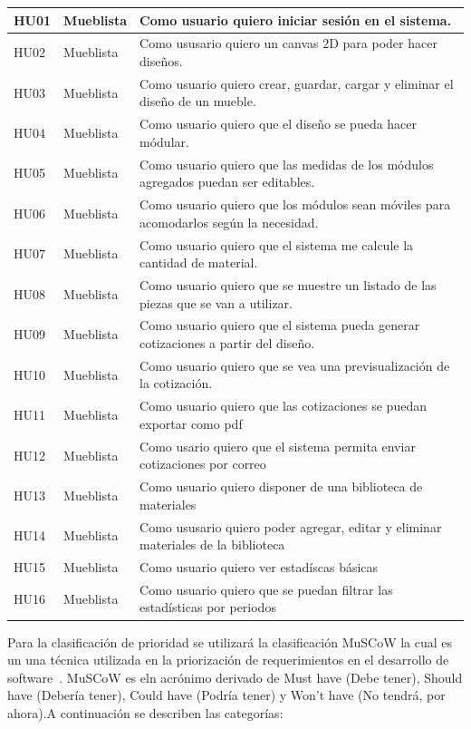 ﻿\documentclass{iccmemoria}
\begin{document}
\begin{table}[H]
\begin{tabular}{|p{}|p{2cm}|p{11cm}|}
HU01 & Mueblista & Como usuario quiero iniciar sesión en el sistema.\\
\hline
HU02 & Mueblista & Como ususario quiero un canvas 2D para poder hacer diseños. \\
\hline
HU03 & Mueblista & Como usuario quiero crear, guardar, cargar y eliminar el diseño de un mueble.\\
\hline
HU04 & Mueblista & Como usuario quiero que el diseño se pueda hacer módular.\\
\hline
HU05 & Mueblista & Como usuario quiero que las medidas de los módulos agregados puedan ser editables.\\
\hline
HU06 & Mueblista & Como usuario quiero que los módulos sean móviles para acomodarlos según la necesidad.\\
\hline
HU07 & Mueblista & Como usuario quiero que el sistema me calcule la cantidad de material.\\
\hline
HU08 & Mueblista & Como usuario quiero que se muestre un listado de las piezas que se van a utilizar.\\
\hline
HU09 & Mueblista & Como usuario quiero que el sistema pueda generar cotizaciones a partir del diseño.\\
\hline
HU10 & Mueblista & Como usuario quiero que se vea una previsualización de la cotización.\\
\hline
HU11 & Mueblista & Como usuario quiero que las cotizaciones se puedan exportar como pdf\\
\hline
HU12 & Mueblista & Como usario quiero que el sistema permita enviar cotizaciones por correo\\
\hline
HU13 & Mueblista & Como usuario quiero disponer de una biblioteca de materiales\\
\hline
HU14 & Mueblista & Como ususario quiero poder agregar, editar y eliminar materiales de la biblioteca\\
\hline
HU15 & Mueblista & Como usuario quiero ver estadíscas básicas \\
\hline
HU16 & Mueblista & Como usuario quiero que se puedan filtrar las estadísticas por periodos\\
        \hline %
    \end{tabular}
\end{table}
\vspace{2em}
Para la clasificación de prioridad se utilizará la clasificación MuSCoW la cual es un una técnica utilizada en la priorización de requerimientos en el desarrollo de software~\cite{priorizacion}. MuSCoW es eln acrónimo derivado de Must have (Debe tener), Should have (Debería tener), Could have (Podría tener) y Won't have (No tendrá, por ahora).A continuación se describen las categorías:
\end{document}
